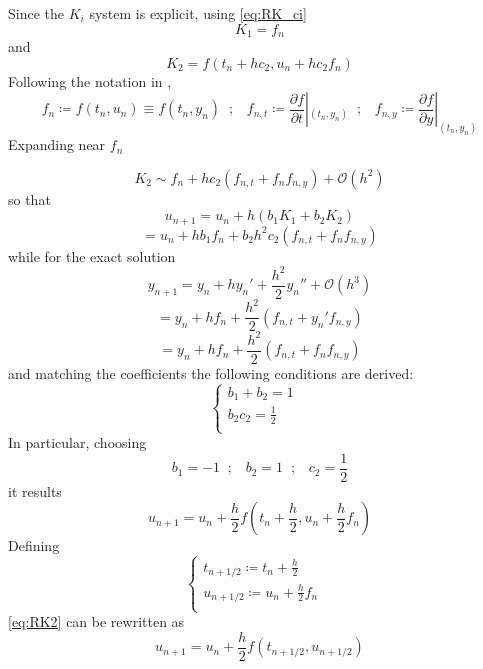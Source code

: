 Since the $K_i$ system is explicit, using \autoref{eq:RK_ci}
\[ K_1 = f_n \]
and 
\[ K_2 = f(t_n+hc_2, u_n + h c_2 f_n) \]
Following the notation in \autocite[chapter 11.8]{quarteroni2010numerical}, 
\[ f_n \coloneqq f(t_n,u_n) \equiv f(t_n,y_n) \;\;;\;\;\; f_{n,t} \coloneqq \frac{\partial f}{\partial t}|_{(t_n,y_n)} \;\;;\;\;\;
f_{n,y} \coloneqq \frac{\partial f}{\partial y}|_{(t_n,y_n)}\]
Expanding near $f_n$

\[ K_2 \sim f_n + h c_2 (f_{n,t} + f_nf_{n,y}) + \mathcal{O}(h^2) \]
so that
\[ u_{n+1} = u_n + h(b_1K_1 + b_2K_2) \]
\[   = u_n + hb_1 f_n + b_2 h^2 c_2 (f_{n,t} + f_n f_{n,y} ) \]
while for the exact solution
\[ y_{n+1} = y_n + hy_n' +\frac{h^2}{2}y_n'' +\mathcal{O}(h^3) \]
\[  = y_n + h f_n + \frac{h^2}{2} (f_{n,t} + y_n' f_{n,y}) \]
\[ = y_n + h f_n + \frac{h^2}{2} (f_{n,t} + f_n f_{n,y}) \]
and matching the coefficients the following conditions are derived:
\begin{equation}
    \begin{cases}
        b_1+b_2 = 1 & \\
        b_2c_2 = \frac{1}{2} & \\
    \end{cases}
\end{equation}
In particular, choosing 
\[ b_1 = -1 \;\;;\;\;\; b_2 = 1 \;\;;\;\;\; c_2 = \frac{1}{2} \]
it results
\begin{equation} \label{eq:RK2}
u_{n+1} = u_n + \frac{h}{2} f(t_n + \frac{h}{2},
u_n + \frac{h}{2} f_n) 
\end{equation}
Defining
\begin{equation}
    \begin{cases}
        t_{n+1/2} \coloneqq t_n + \frac{h}{2} & \\
        u_{n+1/2} \coloneqq u_n + \frac{h}{2} f_n  & \\
    \end{cases}
\end{equation}
\autoref{eq:RK2} can be rewritten as
\begin{equation} \label{eq:RK2_halfstep}
    u_{n+1} = u_n + \frac{h}{2} f(t_{n+1/2},u_{n+1/2})
\end{equation}


